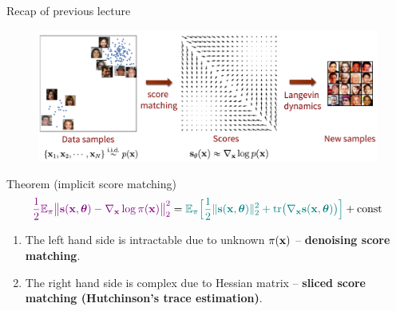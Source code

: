 

\usepackage{tikz}

\usetikzlibrary{arrows,shapes,positioning,shadows,trees}

\begin{frame}
\titlepage
\end{frame}
\begin{frame}{Recap of previous lecture}
	\begin{figure}
		\centering
		\includegraphics[width=0.75\linewidth]{figs/smld}
	\end{figure}
	\vspace{-0.3cm} 
	\begin{block}{Theorem (implicit score matching)}
		\vspace{-0.6cm}
		\[
		{\color{violet}\frac{1}{2} \mathbb{E}_{\pi}\bigl\| \mathbf{s}(\mathbf{x}, \boldsymbol{\theta}) - \nabla_{\mathbf{x}} \log \pi(\mathbf{x}) \bigr\|^2_2} = {\color{teal}\mathbb{E}_{\pi}\Bigr[ \frac{1}{2}\| \mathbf{s}(\mathbf{x}, \boldsymbol{\theta}) \|_2^2 + \text{tr}\bigl(\nabla_{\mathbf{x}} \mathbf{s}(\mathbf{x}, \boldsymbol{\theta})\bigr) \Bigr]} + \text{const}
		\]
	\end{block}
	\vspace{-0.5cm}
	\begin{enumerate}
		\item {\color{violet}The left hand side} is intractable due to unknown $\pi(\mathbf{x})$ -- \textbf{denoising score matching}. 
		\item {\color{teal}The right hand side} is complex due to Hessian matrix -- \textbf{sliced score matching (Hutchinson's trace estimation)}.
	\end{enumerate}
\end{frame}
